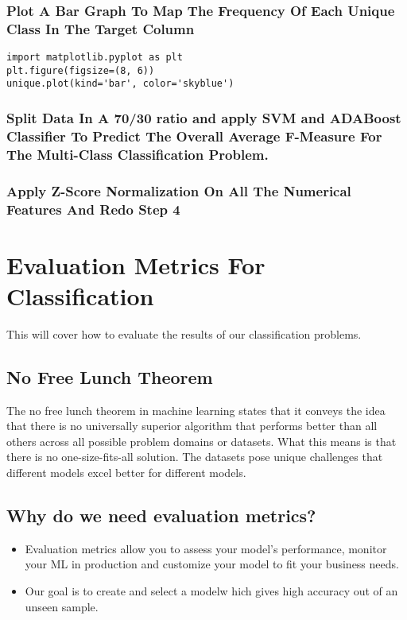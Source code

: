 \documentclass[11pt]{article}
\begin{document}
\subsubsection{Plot A Bar Graph To Map The Frequency Of Each Unique Class In The Target Column}
\label{sec:org6429e7a}
\begin{verbatim}
import matplotlib.pyplot as plt
plt.figure(figsize=(8, 6))
unique.plot(kind='bar', color='skyblue')

\end{verbatim}
\subsubsection{Split Data In A 70/30 ratio and apply SVM and ADABoost Classifier To Predict The Overall Average F-Measure For The Multi-Class Classification Problem.}
\label{sec:org067270b}
\subsubsection{Apply Z-Score Normalization On All The Numerical Features And Redo Step 4}
\label{sec:org588edd8}
\section{Evaluation Metrics For Classification}
\label{sec:org8996090}
This will cover how to evaluate the results of our classification problems.
\subsection{No Free Lunch Theorem}
\label{sec:org0ab0317}
The no free lunch theorem in machine learning states that it conveys the idea that there is no universally superior algorithm that performs better than all others across all possible problem domains or datasets. What this means is that there is no one-size-fits-all solution. The datasets pose unique challenges that different models excel better for different models.
\subsection{Why do we need evaluation metrics?}
\label{sec:orgc9192c7}
\begin{itemize}
\item Evaluation metrics allow you to assess your model's performance, monitor your ML in production and customize your model to fit your business needs.
\item Our goal is to create and select a modelw hich gives high accuracy out of an unseen sample.
\end{itemize}
\end{document}
